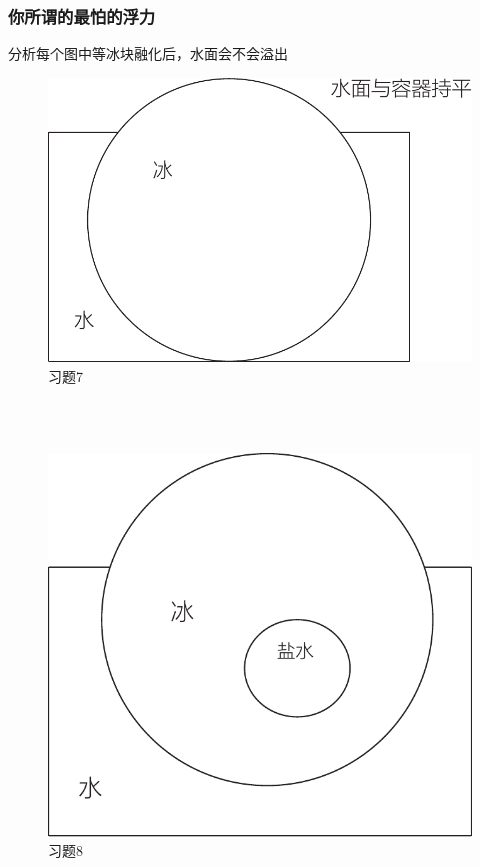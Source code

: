 \documentclass[a4paper, 11pt, oneside]{article}
\begin{document}
\subsubsection{你所谓的最怕的浮力}
分析每个图中等冰块融化后，水面会不会溢出\\
\begin{figure}[!h]
\center
\includegraphics[scale=0.6]{./asset/buoyancy_1.pdf}
\caption{习题7}
\end{figure}
\\ \quad \\
\begin{figure}[!h]
\center
\includegraphics[scale=0.6]{./asset/buoyancy_2.pdf}
\caption{习题8}
\end{figure}
\end{document}
